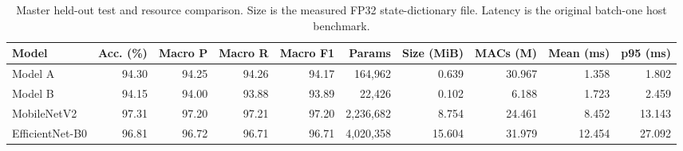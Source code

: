 \begin{landscape}
\begin{table}[p]
\centering\small
\caption{Master held-out test and resource comparison. Size is the measured FP32 state-dictionary file. Latency is the original batch-one host benchmark.}
\label{tab:master-comparison}
\begin{tabular}{lrrrrrrrrr}\toprule
Model & Acc. (\%) & Macro P & Macro R & Macro F1 & Params & Size (MiB) & MACs (M) & Mean (ms) & p95 (ms)\\\midrule
Model A & 94.30 & 94.25 & 94.26 & 94.17 & 164,962 & 0.639 & 30.967 & 1.358 & 1.802\\
Model B & 94.15 & 94.00 & 93.88 & 93.89 & 22,426 & 0.102 & 6.188 & 1.723 & 2.459\\
MobileNetV2 & 97.31 & 97.20 & 97.21 & 97.20 & 2,236,682 & 8.754 & 24.461 & 8.452 & 13.143\\
EfficientNet-B0 & 96.81 & 96.72 & 96.71 & 96.71 & 4,020,358 & 15.604 & 31.979 & 12.454 & 27.092\\
\bottomrule\end{tabular}
\end{table}
\end{landscape}
